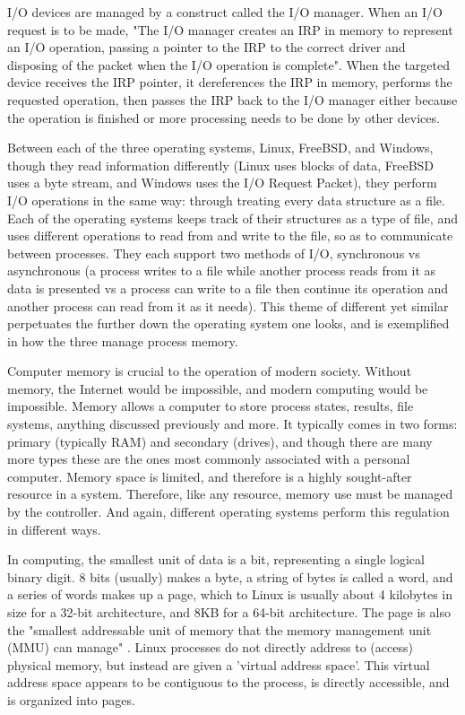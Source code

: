 \documentclass[10pt,draftclsnofoot,onecolumn]{IEEEtran}
\begin{document}
    I/O devices are managed by a construct called the I/O manager. When an I/O request is to be made, "The I/O manager creates an IRP in memory to represent an I/O operation, passing a pointer to the IRP to the correct driver and disposing of the packet when the I/O operation is complete"\cite{russinovich_solomon_ionescu_2012}. When the targeted device receives the IRP pointer, it dereferences the IRP in memory, performs the requested operation, then passes the IRP back to the I/O manager either because the operation is finished or more processing needs to be done by other devices.\par
    Between each of the three operating systems, Linux, FreeBSD, and Windows, though they read information differently (Linux uses blocks of data, FreeBSD uses a byte stream, and Windows uses the I/O Request Packet), they perform I/O operations in the same way: through treating every data structure as a file. Each of the operating systems keeps track of their structures as a type of file, and uses different operations to read from and write to the file, so as to communicate between processes. They each support two methods of I/O, synchronous vs asynchronous (a process writes to a file while another process reads from it as data is presented vs a process can write to a file then continue its operation and another process can read from it as it needs). This theme of different yet similar perpetuates the further down the operating system one looks, and is exemplified in how the three manage process memory.\par
    Computer memory is crucial to the operation of modern society. Without memory, the Internet would be impossible, and modern computing would be impossible. Memory allows a computer to store process states, results, file systems, anything discussed previously and more. It typically comes in two forms: primary (typically RAM) and secondary (drives), and though there are many more types these are the ones most commonly associated with a personal computer. Memory space is limited, and therefore is a highly sought-after resource in a system. Therefore, like any resource, memory use must be managed by the controller. And again, different operating systems perform this regulation in different ways.\par
    In computing, the smallest unit of data is a bit, representing a single logical binary digit. 8 bits (usually) makes a byte, a string of bytes is called a word, and a series of words makes up a page, which to Linux is usually about 4 kilobytes in size for a 32-bit architecture, and 8KB for a 64-bit architecture. The page is also the "smallest addressable unit of memory that the memory management unit (MMU) can manage" \cite{love_2014}. Linux processes do not directly address to (access) physical memory, but instead are given a 'virtual address space'. This virtual address space appears to be contiguous to the process, is directly accessible, and is organized into pages.\par
\end{document}

